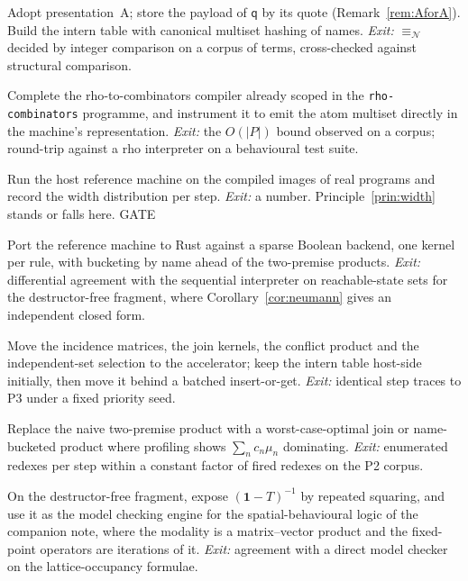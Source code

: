 \documentclass[11pt,a4paper]{article}
\theoremstyle{plain}
\theoremstyle{definition}
\theoremstyle{remark}
\newcommand{\rhoc}{\textsf{rho}}
\newcommand{\nequiv}{\equiv_{\mathcal{N}}}
\newcommand{\qq}{\mathsf{q}}
\begin{document}
\begin{description}[leftmargin=2.6em,style=nextline]
\item[P0. Presentation and storage decisions.] Adopt presentation~A; store the
  payload of $\qq$ by its quote (Remark~\ref{rem:AforA}). Build the intern
  table with canonical multiset hashing of names.
  \emph{Exit:} $\nequiv$ decided by integer comparison on a corpus of terms,
  cross-checked against structural comparison.
\item[P1. The compiler, instrumented.] Complete the \rhoc{}-to-combinators
  compiler already scoped in the \texttt{rho-combinators} programme, and
  instrument it to emit the atom multiset directly in the machine's
  representation.
  \emph{Exit:} the $O(|P|)$ bound observed on a corpus; round-trip against a
  \rhoc{} interpreter on a behavioural test suite.
\item[P2. The width measurement.] Run the host reference machine on the
  compiled images of real programs and record the width distribution per step.
  \emph{Exit:} a number. Principle~\ref{prin:width} stands or falls here.
  \textsf{GATE}
\item[P3. Host implementation in earnest.] Port the reference machine to Rust
  against a sparse Boolean backend, one kernel per rule, with bucketing by
  name ahead of the two-premise products.
  \emph{Exit:} differential agreement with the sequential interpreter on
  reachable-state sets for the destructor-free fragment, where
  Corollary~\ref{cor:neumann} gives an independent closed form.
\item[P4. The device port.] Move the incidence matrices, the join
  kernels, the conflict product and the independent-set selection to the
  accelerator; keep the intern table host-side initially, then move it behind
  a batched insert-or-get.
  \emph{Exit:} identical step traces to P3 under a fixed priority seed.
\item[P5. Contention remedies.] Replace the naive two-premise product with a
  worst-case-optimal join or name-bucketed product where profiling shows
  $\sum_n c_n\mu_n$ dominating.
  \emph{Exit:} enumerated redexes per step within a constant factor of fired
  redexes on the P2 corpus.
\item[P6. The by-product for the logic.] On the destructor-free fragment,
  expose $(\mathbf{1}-T)^{-1}$ by repeated squaring, and use it as the model
  checking engine for the spatial-behavioural logic of the companion note,
  where the modality is a matrix--vector product and the fixed-point operators
  are iterations of it.
  \emph{Exit:} agreement with a direct model checker on the lattice-occupancy
  formulae.
\end{description}
\end{document}
